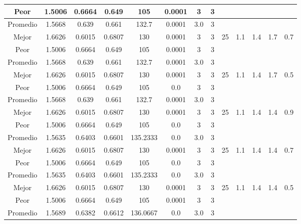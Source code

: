 \begin{table}[h!]
\begin{center}
\begin{tabular}{|c|c|c|c|c|c|c|c|c|c|c|c|c|}
            \cline{1-8}
            Peor & 1.5006 & 0.6664  & 0.649 & 105 & 0.0001 & 3 & 3 &  &  &  &  & \\
        \hline
        \hline
            Promedio  & 1.5668 & 0.639 & 0.661 & 132.7 & 0.0001 & 3.0 & 3 &  &  &  &  & \\
            \cline{1-8}
            Mejor & 1.6626 & 0.6015  & 0.6807 & 130 & 0.0001 & 3 & 3 & 25 & 1.1 & 1.4 & 1.7 & 0.7\\
            \cline{1-8}
            Peor & 1.5006 & 0.6664  & 0.649 & 105 & 0.0001 & 3 & 3 &  &  &  &  & \\
        \hline
        \hline
            Promedio  & 1.5668 & 0.639 & 0.661 & 132.7 & 0.0001 & 3.0 & 3 &  &  &  &  & \\
            \cline{1-8}
            Mejor & 1.6626 & 0.6015  & 0.6807 & 130 & 0.0001 & 3 & 3 & 25 & 1.1 & 1.4 & 1.7 & 0.5\\
            \cline{1-8}
            Peor & 1.5006 & 0.6664  & 0.649 & 105 & 0.0 & 3 & 3 &  &  &  &  & \\
        \hline
        \hline
            Promedio  & 1.5668 & 0.639 & 0.661 & 132.7 & 0.0001 & 3.0 & 3 &  &  &  &  & \\
            \cline{1-8}
            Mejor & 1.6626 & 0.6015  & 0.6807 & 130 & 0.0001 & 3 & 3 & 25 & 1.1 & 1.4 & 1.4 & 0.9\\
            \cline{1-8}
            Peor & 1.5006 & 0.6664  & 0.649 & 105 & 0.0 & 3 & 3 &  &  &  &  & \\
        \hline
        \hline
            Promedio  & 1.5635 & 0.6403 & 0.6601 & 135.2333 & 0.0 & 3.0 & 3 &  &  &  &  & \\
            \cline{1-8}
            Mejor & 1.6626 & 0.6015  & 0.6807 & 130 & 0.0001 & 3 & 3 & 25 & 1.1 & 1.4 & 1.4 & 0.7\\
            \cline{1-8}
            Peor & 1.5006 & 0.6664  & 0.649 & 105 & 0.0 & 3 & 3 &  &  &  &  & \\
        \hline
        \hline
            Promedio  & 1.5635 & 0.6403 & 0.6601 & 135.2333 & 0.0 & 3.0 & 3 &  &  &  &  & \\
            \cline{1-8}
            Mejor & 1.6626 & 0.6015  & 0.6807 & 130 & 0.0001 & 3 & 3 & 25 & 1.1 & 1.4 & 1.4 & 0.5\\
            \cline{1-8}
            Peor & 1.5006 & 0.6664  & 0.649 & 105 & 0.0001 & 3 & 3 &  &  &  &  & \\
        \hline
        \hline
            Promedio  & 1.5689 & 0.6382 & 0.6612 & 136.0667 & 0.0 & 3.0 & 3 &  &  &  &  & \\

\end{tabular}
\end{center}
\end{table}
